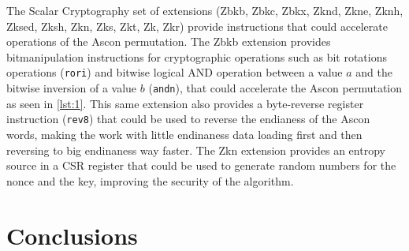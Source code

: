 \documentclass[11pt,twoside]{article}
\begin{document}
The Scalar Cryptography set of extensions (Zbkb, Zbkc, Zbkx, Zknd, Zkne, Zknh, Zksed, Zksh, Zkn, Zks, Zkt, Zk, Zkr) \cite{riscvCryptoVol1} provide instructions that could accelerate operations of the Ascon permutation.
The Zbkb extension provides bitmanipulation instructions for cryptographic operations such as bit rotations operations (\texttt{rori}) and bitwise logical AND operation between a value $a$ and the bitwise inversion of a value $b$ (\texttt{andn}), that could accelerate the Ascon permutation as seen in \cref{lst:1}. This same extension also provides a byte-reverse register instruction (\texttt{rev8}) that could be used to reverse the endianess of the Ascon words, making the work with little endinaness data loading first and then reversing to big endinaness way faster. The Zkn extension provides an entropy source in a CSR register that could be used to generate random numbers for the nonce and the key, improving the security of the algorithm.


\section{Conclusions}

\printbibliography
\end{document}
